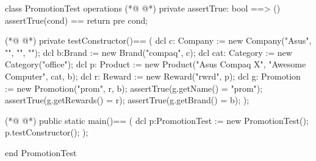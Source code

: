 \begin{vdmpp}[breaklines=true]
class PromotionTest
 operations
(*@
\label{assertTrue:3}
@*)
  private assertTrue: bool ==> ()
    assertTrue(cond) == return
    pre cond;
    
(*@
\label{testConstructor:7}
@*)
  private testConstructor()==
  (
      dcl c: Company := new Company("Asus", "", "", "");
      dcl b:Brand := new Brand("compaq", c);
      dcl cat: Category := new Category("office");
      dcl p: Product := new Product("Asus Compaq X", "Awesome Computer", cat, b);
      dcl r: Reward := new Reward("rwrd", p);
   dcl g: Promotion := new Promotion("prom", {r}, b);
   assertTrue(g.getName() = "prom");
   assertTrue(g.getRewards() = {r});
   assertTrue(g.getBrand() = b);
  );
 
(*@
\label{main:20}
@*)
  public static main()==
    (
   dcl p:PromotionTest := new PromotionTest();
   p.testConstructor();
    );

end PromotionTest
\end{vdmpp}
